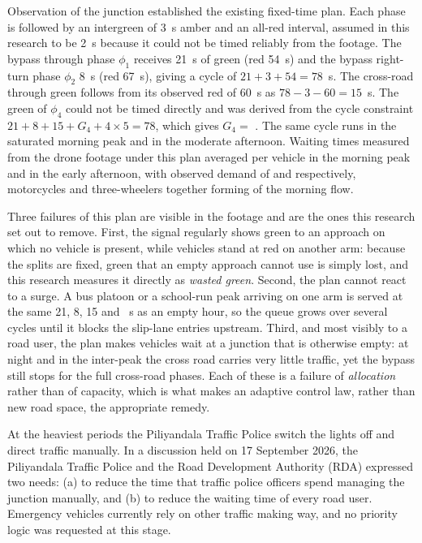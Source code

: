 Observation of the junction established the existing fixed-time plan. Each phase is followed by an intergreen of 3~s amber and an all-red interval, assumed in this research to be 2~s because it could not be timed reliably from the footage. The bypass through phase $\phi_1$ receives 21~s of green (red 54~s) and the bypass right-turn phase $\phi_2$ 8~s (red 67~s), giving a cycle of $21 + 3 + 54 = 78$~s. The cross-road through green follows from its observed red of 60~s as $78 - 3 - 60 = 15$~s. The green of $\phi_4$ could not be timed directly and was derived from the cycle constraint $21 + 8 + 15 + G_4 + 4 \times 5 = 78$, which gives $G_4 = $ . The same cycle runs in the saturated morning peak and in the moderate afternoon. Waiting times measured from the drone footage under this plan averaged  per vehicle in the morning peak and  in the early afternoon, with observed demand of  and  respectively, motorcycles and three-wheelers together forming  of the morning flow.

Three failures of this plan are visible in the footage and are the ones this research set out to remove. First, the signal regularly shows green to an approach on which no vehicle is present, while vehicles stand at red on another arm: because the splits are fixed, green that an empty approach cannot use is simply lost, and this research measures it directly as \emph{wasted green}. Second, the plan cannot react to a surge. A bus platoon or a school-run peak arriving on one arm is served at the same 21, 8, 15 and ~s as an empty hour, so the queue grows over several cycles until it blocks the slip-lane entries upstream. Third, and most visibly to a road user, the plan makes vehicles wait at a junction that is otherwise empty: at night and in the inter-peak the cross road carries very little traffic, yet the bypass still stops for the full cross-road phases. Each of these is a failure of \emph{allocation} rather than of capacity, which is what makes an adaptive control law, rather than new road space, the appropriate remedy.

At the heaviest periods the Piliyandala Traffic Police switch the lights off and direct traffic manually. In a discussion held on 17 September 2026, the Piliyandala Traffic Police and the Road Development Authority (RDA) expressed two needs: (a) to reduce the time that traffic police officers spend managing the junction manually, and (b) to reduce the waiting time of every road user. Emergency vehicles currently rely on other traffic making way, and no priority logic was requested at this stage.

